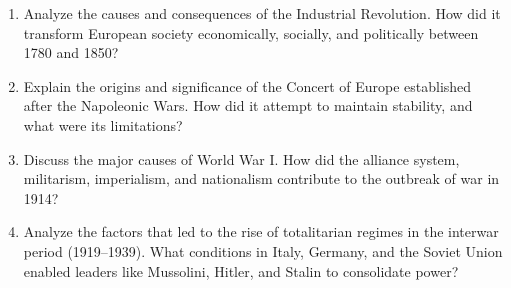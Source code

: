 \documentclass[11pt]{article}
\begin{document}
\begin{enumerate}[label=\textbf{\arabic*.}]
  \item Analyze the causes and consequences of the Industrial Revolution. How did it transform 
  European society economically, socially, and politically between 1780 and 1850?

  \item Explain the origins and significance of the Concert of Europe established after the Napoleonic 
  Wars. How did it attempt to maintain stability, and what were its limitations?

  \item Discuss the major causes of World War I. How did the alliance system, militarism, imperialism, 
  and nationalism contribute to the outbreak of war in 1914?

  \item Analyze the factors that led to the rise of totalitarian regimes in the interwar period 
  (1919--1939). What conditions in Italy, Germany, and the Soviet Union enabled leaders like 
  Mussolini, Hitler, and Stalin to consolidate power?

\end{enumerate}
\end{document}
